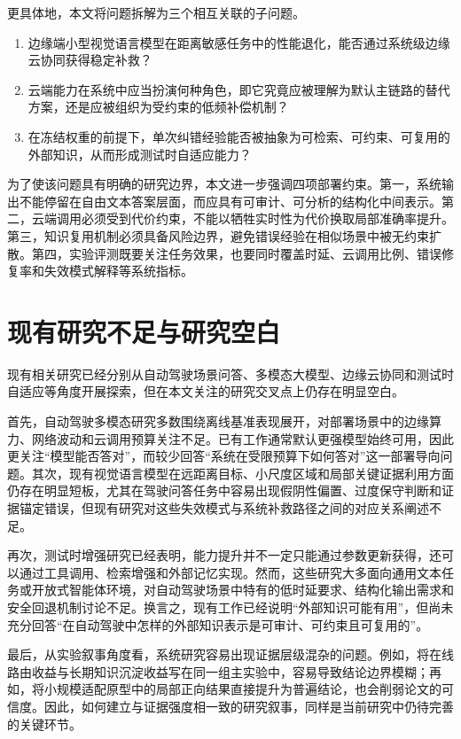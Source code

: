 更具体地，本文将问题拆解为三个相互关联的子问题。

\begin{enumerate}
  \item 边缘端小型视觉语言模型在距离敏感任务中的性能退化，能否通过系统级边缘云协同获得稳定补救？
  \item 云端能力在系统中应当扮演何种角色，即它究竟应被理解为默认主链路的替代方案，还是应被组织为受约束的低频补偿机制？
  \item 在冻结权重的前提下，单次纠错经验能否被抽象为可检索、可约束、可复用的外部知识，从而形成测试时自适应能力？
\end{enumerate}

为了使该问题具有明确的研究边界，本文进一步强调四项部署约束。第一，系统输出不能停留在自由文本答案层面，而应具有可审计、可分析的结构化中间表示。第二，云端调用必须受到代价约束，不能以牺牲实时性为代价换取局部准确率提升。第三，知识复用机制必须具备风险边界，避免错误经验在相似场景中被无约束扩散。第四，实验评测既要关注任务效果，也要同时覆盖时延、云调用比例、错误修复率和失效模式解释等系统指标。

\section{现有研究不足与研究空白}
\label{sec:intro-gap}

现有相关研究已经分别从自动驾驶场景问答、多模态大模型、边缘云协同和测试时自适应等角度开展探索，但在本文关注的研究交叉点上仍存在明显空白。

首先，自动驾驶多模态研究多数围绕离线基准表现展开，对部署场景中的边缘算力、网络波动和云调用预算关注不足。已有工作通常默认更强模型始终可用，因此更关注“模型能否答对”，而较少回答“系统在受限预算下如何答对”这一部署导向问题。其次，现有视觉语言模型在远距离目标、小尺度区域和局部关键证据利用方面仍存在明显短板，尤其在驾驶问答任务中容易出现假阴性偏置、过度保守判断和证据锚定错误，但现有研究对这些失效模式与系统补救路径之间的对应关系阐述不足。

再次，测试时增强研究已经表明，能力提升并不一定只能通过参数更新获得，还可以通过工具调用、检索增强和外部记忆实现\cite{yao2023react,shinn2023reflexion,madaan2023selfrefine,schick2023toolformer,lewis2020rag,guu2020realm}。然而，这些研究大多面向通用文本任务或开放式智能体环境，对自动驾驶场景中特有的低时延要求、结构化输出需求和安全回退机制讨论不足。换言之，现有工作已经说明“外部知识可能有用”，但尚未充分回答“在自动驾驶中怎样的外部知识表示是可审计、可约束且可复用的”。

最后，从实验叙事角度看，系统研究容易出现证据层级混杂的问题。例如，将在线路由收益与长期知识沉淀收益写在同一组主实验中，容易导致结论边界模糊；再如，将小规模适配原型中的局部正向结果直接提升为普遍结论，也会削弱论文的可信度。因此，如何建立与证据强度相一致的研究叙事，同样是当前研究中仍待完善的关键环节。

